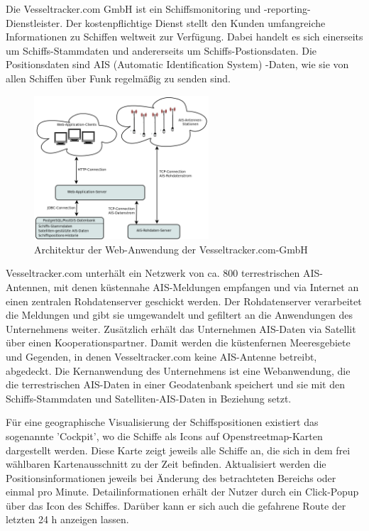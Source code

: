 Die Vesseltracker.com GmbH ist ein Schiffsmonitoring und -reporting-Dienstleister. Der kostenpflichtige Dienst stellt den Kunden umfangreiche Informationen zu Schiffen weltweit zur Verfügung. Dabei handelt es sich einerseits um Schiffs-Stammdaten und andererseits um Schiffs-Postionsdaten. Die Positionsdaten sind AIS (Automatic Identification System) -Daten, wie sie von allen Schiffen über Funk regelmäßig zu senden sind.

\begin{figure}
  \begin{center}
    \includegraphics[width=0.58\textwidth]{images/Exposee_graphik_Webapp}
  \end{center}
  \caption{Architektur der Web-Anwendung der Vesseltracker.com-GmbH}
\end{figure}

Vesseltracker.com unterhält ein Netzwerk von ca. 800 terrestrischen AIS-Antennen, mit denen küstennahe AIS-Meldungen empfangen und via Internet an einen zentralen Rohdatenserver geschickt werden. Der Rohdatenserver verarbeitet die Meldungen und gibt sie umgewandelt und gefiltert an die Anwendungen des Unternehmens weiter.
Zusätzlich erhält das Unternehmen AIS-Daten via Satellit über einen Kooperationspartner. Damit werden die küstenfernen Meeresgebiete und Gegenden, in denen Vesseltracker.com keine AIS-Antenne betreibt, abgedeckt.
Die Kernanwendung des Unternehmens ist eine Webanwendung, die die terrestrischen AIS-Daten in einer Geodatenbank speichert und sie mit den Schiffs-Stammdaten und Satelliten-AIS-Daten in Beziehung setzt.

Für eine geographische Visualisierung der Schiffspositionen existiert das sogenannte 'Cockpit', wo die Schiffe als Icons auf Openstreetmap-Karten dargestellt werden. Diese Karte zeigt jeweils alle Schiffe an, die sich in dem frei wählbaren Kartenausschnitt zu der Zeit befinden. Aktualisiert werden die Positionsinformationen jeweils bei Änderung des betrachteten Bereichs oder einmal pro Minute. Detailinformationen erhält der Nutzer durch ein Click-Popup über das Icon des Schiffes. Darüber kann er sich auch die gefahrene Route der letzten 24 h anzeigen lassen.


